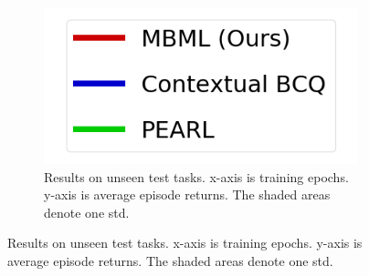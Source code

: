 \begin{figure}[!t]
    \begin{minipage}{0.28\textwidth}
        \begin{figure}[H]
            \centering
            \includegraphics[width=\textwidth]{chapter_2/fig/legend_baseline.png}
            \caption{Results on unseen test tasks.
                x-axis is training epochs.
                y-axis is average episode returns.
                The shaded areas denote one std.
            }\label{fig:testing_performance}
        \end{figure}
    \end{minipage}
    \hfill
    \addtocounter{figure}{-1}
    \begin{minipage}{0.69\textwidth}

\end{minipage}
\end{figure}

